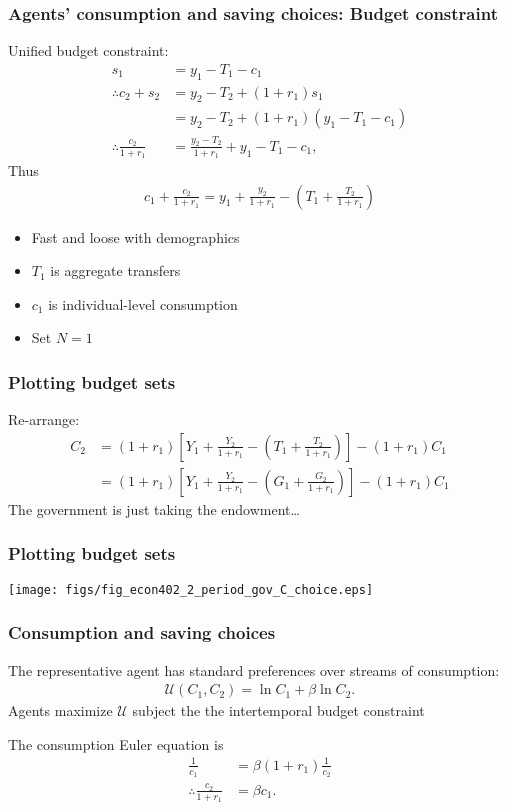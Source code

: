 \documentclass[presentation,dvipsnames]{beamer}
\begin{document}
\begin{frame}
\frametitle{Agents' consumption and saving choices: Budget constraint}
Unified budget constraint:
\begin{align*}
s_{1} &= y_{1} - T_{1} - c_{1} \\
\therefore c_{2} + s_{2} &= y_{2} - T_{2} + (1+r_{1})s_{1} \\
&= y_{2} - T_{2} + (1+r_{1}) \left( y_{1} - T_{1} - c_{1} \right) \\
\therefore \frac{c_{2}}{1+r_{1}} &= \frac{y_{2} - T_{2}}{1+r_{1}} + y_{1} - T_{1} - c_{1},
\end{align*}
Thus
\begin{align*}
c_{1} + \frac{c_{2}}{1+r_{1}} = y_{1} + \frac{y_{2}}{1+r_{1}} - \left( T_{1} + \frac{T_{2}}{1+r_{1}} \right)
\end{align*}
\begin{itemize}[label={--}]
\item Fast and loose with demographics
\item $T_{1}$ is aggregate transfers
\item $c_{1}$ is individual-level consumption
\item Set $N = 1$
\end{itemize}
\end{frame}

\begin{frame}
\frametitle{Plotting budget sets}
Re-arrange:
\begin{align*}
C_{2} &= (1+r_{1})\left[ Y_{1} + \frac{Y_{2}}{1+r_{1}} - \left( T_{1} + \frac{T_{2}}{1+r_{1}} \right) \right] - (1+r_{1})C_{1} \\
&= (1+r_{1})\left[ Y_{1} + \frac{Y_{2}}{1+r_{1}} - \left( G_{1} + \frac{G_{2}}{1+r_{1}} \right) \right] - (1+r_{1})C_{1}
\end{align*}
The government is just taking the endowment\dots
\end{frame}

\begin{frame}
\frametitle{Plotting budget sets}
\centerline{\texttt{[image: figs/fig\_econ402\_2\_period\_gov\_C\_choice.eps]}}
\end{frame}

\begin{frame}
\frametitle{Consumption and saving choices}
The representative agent has standard preferences over streams of consumption:
\begin{align*}
\mathcal{U}(C_{1},C_{2}) = \ln C_{1} + \beta \ln C_{2}.
\end{align*}
Agents maximize $\mathcal{U}$ subject the the intertemporal budget constraint 

\vspace{1em}

The consumption Euler equation is
\begin{align*}
\frac{1}{c_{1}} &= \beta (1+r_{1}) \frac{1}{c_{2}} \\
\therefore \frac{c_{2}}{1+r_{1}} &= \beta c_{1}.
\end{align*}
\end{frame}
\end{document}
